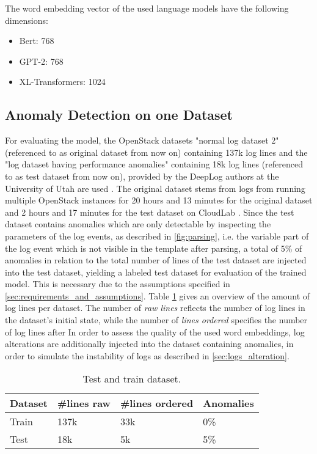 \noindent The word embedding vector of the used language models have the following dimensions:
\begin{itemize}
	\item Bert: 768 
	\item GPT-2: 768
	\item XL-Transformers: 1024
\end{itemize}

\subsection{Anomaly Detection on one Dataset \label{sec:ad_one_ds_result}}
For evaluating the model, the OpenStack datasets "normal log dataset 2" (referenced to as original dataset from now on) containing 137k log lines and the "log dataset having performance anomalies" containing 18k log lines (referenced to as test dataset from now on), provided by the DeepLog authors at the University of Utah are used \cite{utah_dataset}. The original dataset stems from logs from running multiple OpenStack instances for 20 hours and 13 minutes for the original dataset and 2 hours and 17 minutes for the test dataset on CloudLab \cite{cloudlab}. Since the test dataset contains anomalies which are only detectable by inspecting the parameters of the log events, as described in \ref{fig:parsing}, i.e. the variable part of the log event which is not visible in the template after parsing, a total of 5\% of anomalies in relation to the total number of lines of the test dataset are injected into the test dataset, yielding a labeled test dataset for evaluation of the trained model. This is necessary due to the assumptions specified in \ref{sec:requirements_and_assumptions}. Table \ref{tab:test_train_ds} gives an overview of the amount of log lines per dataset. The number of \textit{raw lines} reflects the number of log lines in the dataset's initial state, while the number of \textit{lines ordered} specifies the number of log lines after 
In order to assess the quality of the used word embeddings, log alterations are additionally injected into the dataset containing anomalies, in order to simulate the instability of logs as described in \ref{sec:logs_alteration}.

\begin{table}[ht]
\centering
\begin{small}
\begin{tabular}{ p{1.3cm} p{1.8cm} p{2.3cm} p{1.7cm}}
\toprule
Dataset & \#lines raw & \#lines ordered & Anomalies\\
\midrule
Train & 137k & 33k & 0\%\\
Test & 18k & 5k & 5\%\\ 

\bottomrule
\end{tabular}
\caption{Test and train dataset.}
\label{tab:test_train_ds}
\end{small}
\end{table}


